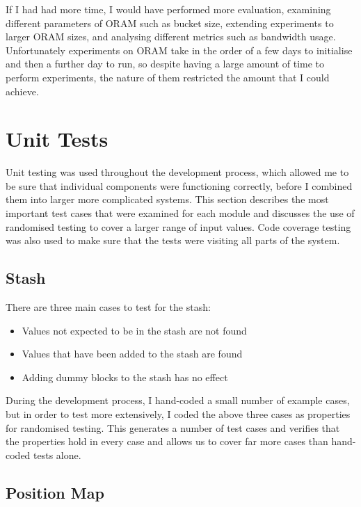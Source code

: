 \documentclass[12pt,a4paper,twoside,openright]{report}
\begin{document}
If I had had more time, I would have performed more evaluation, examining different parameters of ORAM such as bucket size, extending experiments to larger ORAM sizes, and analysing different metrics such as bandwidth usage. Unfortunately experiments on ORAM take in the order of a few days to initialise and then a further day to run, so despite having a large amount of time to perform experiments, the nature of them restricted the amount that I could achieve.

\section{Unit Tests}
\label{sec:unitTests}

Unit testing was used throughout the development process, which allowed me to be sure that individual components were functioning correctly, before I combined them into larger more complicated systems. This section describes the most important test cases that were examined for each module and discusses the use of randomised testing to cover a larger range of input values. Code coverage testing was also used to make sure that the tests were visiting all parts of the system.

\subsection{Stash}

There are three main cases to test for the stash:

\begin{itemize}
  \item Values not expected to be in the stash are not found
  \item Values that have been added to the stash are found
  \item Adding dummy blocks to the stash has no effect
\end{itemize}

During the development process, I hand-coded a small number of example cases, but in order to test more extensively, I coded the above three cases as properties for randomised testing. This generates a number of test cases and verifies that the properties hold in every case and allows us to cover far more cases than hand-coded tests alone.

\subsection{Position Map}
\end{document}
